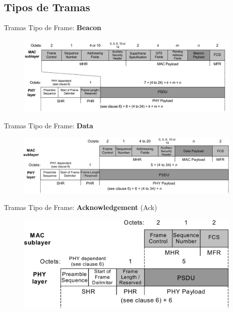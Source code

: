 \documentclass[aspectratio=169]{beamer}
\begin{document}
\subsection[Tramas]{Tipos de Tramas}

\begin{frame}[t]{Tramas}
Tipo de Frame: \textbf{Beacon}
\vspace{10px}
	\begin{figure}[H]
		\includegraphics[width=1\textwidth]{./imagenes/beacon.jpg}
	\end{figure}	  	  	
\end{frame}

\begin{frame}[t]{Tramas}
Tipo de Frame: \textbf{Data}
\vspace{10px}
	\begin{figure}[H]
		\includegraphics[width=1\textwidth]{./imagenes/data.jpg}
	\end{figure}	  	  	
\end{frame}


\begin{frame}[t]{Tramas}
Tipo de Frame: \textbf{Acknowledgement} (Ack)
\vspace{10px}
	\begin{figure}[H]
	\centering
		\includegraphics[width=.8\textwidth]{./imagenes/ack.jpg}
	\end{figure}	  	  	
\end{frame}
\end{document}
